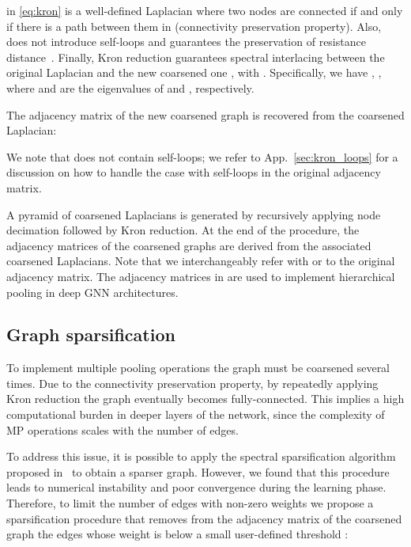 \documentclass[journal]{IEEEtran}
\begin{document}
 in \eqref{eq:kron} is a well-defined Laplacian where two nodes are connected if and only if there is a path between them in  (connectivity preservation property). 
Also,  does not introduce self-loops and guarantees the preservation of resistance distance~\cite{shuman2016multiscale}.
Finally, Kron reduction guarantees spectral interlacing between the original Laplacian  and the new coarsened one , with .
Specifically, we have , , where  and  are the eigenvalues of  and , respectively.

The adjacency matrix of the new coarsened graph is recovered from the coarsened Laplacian: 


We note that  does not contain self-loops;
we refer to App.~\ref{sec:kron_loops} for a discussion on how to handle the case with self-loops in the original adjacency matrix.

A pyramid of coarsened Laplacians is generated by recursively applying node decimation followed by Kron reduction. 
At the end of the procedure, the adjacency matrices  of the coarsened graphs are derived from the associated coarsened Laplacians.
Note that we interchangeably refer with  or  to the original adjacency matrix.
The adjacency matrices in  are used to implement hierarchical pooling in deep GNN architectures.



\subsection{Graph sparsification}
\label{sec:sparsify}

To implement multiple pooling operations the graph must be coarsened several times.
Due to the connectivity preservation property, by repeatedly applying Kron reduction the graph eventually becomes fully-connected.
This implies a high computational burden in deeper layers of the network, since the complexity of MP operations scales with the number of edges.

To address this issue, it is possible to apply the spectral sparsification algorithm proposed in~\cite{batson2013spectral} to obtain a sparser graph. However, we found that this procedure leads to numerical instability and poor convergence during the learning phase.
Therefore, to limit the number of edges with non-zero weights we propose a sparsification procedure that removes from the adjacency matrix of the coarsened graph the edges whose weight is below a small user-defined threshold :
\end{document}

